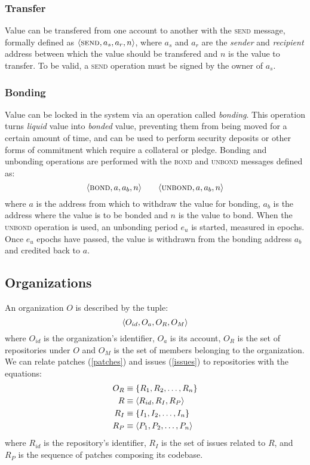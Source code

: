 \subsubsection{Transfer}

Value can be transfered from one account to another with the \textsc{send}
message, formally defined as $\langle \text{\normalfont\scshape send}, a_{s}, a_{r}, n \rangle$, where $a_{s}$ and
$a_{r}$ are the \emph{sender} and \emph{recipient} address between which the
value should be transfered and $n$ is the value to transfer.  To be valid, a
\textsc{send} operation must be signed by the owner of $a_{s}$.

\subsubsection{Bonding}

Value can be locked in the system via an operation called \emph{bonding}.
This operation turns \emph{liquid} value into \emph{bonded} value, preventing
them from being moved for a certain amount of time, and can be used to perform
security deposits or other forms of commitment which require a collateral or
pledge. Bonding and unbonding operations are performed with the
\textsc{bond} and \textsc{unbond} messages defined as:
\[
    \tx{bond}{a, a_b, n} \qquad \tx{unbond}{a, a_b, n}
    \medskip
\]
where $a$ is the address from which to withdraw the value for bonding, $a_b$ is
the address where the value is to be bonded and $n$ is the value to bond. When
the \textsc{unbond} operation is used, an unbonding period $e_u$ is started,
measured in epochs. Once $e_{u}$ epochs have passed, the value is withdrawn
from the bonding address $a_b$ and credited back to $a$.

\subsection{Organizations}
\label{orgs}

An organization $O$ is described by the tuple:
\[
    \langle O_{id}, O_{a}, O_R, O_M \rangle
\]
where $O_{id}$ is the organization's identifier, $O_a$ is its account, $O_R$ is
the set of repositories under $O$ and $O_M$ is the set of members belonging to
the organization. We can relate patches (\ref{patches}) and issues
(\ref{issues}) to repositories with the equations:
\begin{align*}
    O_R & \equiv \{R_1, R_2, \dotsc, R_n\}         \\
    R   & \equiv \langle R_{id}, R_I, R_P \rangle         \\
    R_I & \equiv \{I_1, I_2, \dotsc, I_n\}         \\
    R_P & \equiv \langle P_1, P_2, \dotsc, P_n \rangle
\end{align*}
where $R_{id}$ is the repository's identifier, $R_I$ is the set of issues
related to $R$, and $R_P$ is the sequence of patches composing its codebase.

